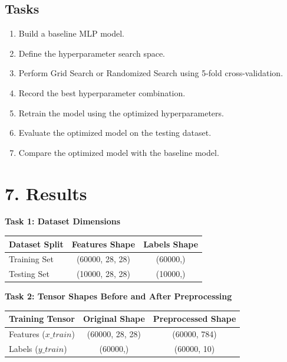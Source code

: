 \documentclass[11pt]{article}
\begin{document}
\subsection*{Tasks}

\begin{enumerate}
\item Build a baseline MLP model.
\item Define the hyperparameter search space.
\item Perform Grid Search or Randomized Search using 5-fold cross-validation.
\item Record the best hyperparameter combination.
\item Retrain the model using the optimized hyperparameters.
\item Evaluate the optimized model on the testing dataset.
\item Compare the optimized model with the baseline model.
\end{enumerate}



\section*{7. Results}
\vspace{4mm}

\noindent\textbf{Task 1: Dataset Dimensions}
\vspace{2mm}

\noindent\begin{tabular}{|l|c|c|}
\hline
\textbf{Dataset Split} & \textbf{Features Shape} & \textbf{Labels Shape} \\
\hline
Training Set & (60000, 28, 28) & (60000,) \\
\hline
Testing Set & (10000, 28, 28) & (10000,) \\
\hline
\end{tabular}

\vspace{6mm}
\noindent\textbf{Task 2: Tensor Shapes Before and After Preprocessing}
\vspace{2mm}

\noindent\begin{tabular}{|l|c|c|}
\hline
\textbf{Training Tensor} & \textbf{Original Shape} & \textbf{Preprocessed Shape} \\
\hline
Features ($x\_train$) & (60000, 28, 28) & (60000, 784) \\
\hline
Labels ($y\_train$) & (60000,) & (60000, 10) \\
\hline
\end{tabular}
\end{document}
